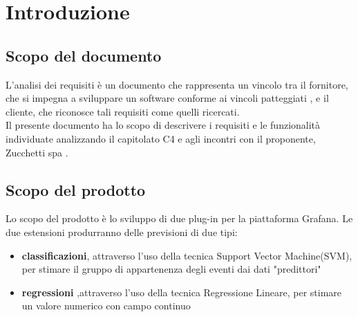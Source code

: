 \section{Introduzione}
	\subsection{Scopo del documento}
	L'analisi dei requisiti è un documento che rappresenta un vincolo tra il fornitore, che si impegna 		a sviluppare un software conforme ai vincoli patteggiati , e il cliente, che riconosce tali 			requisiti come quelli ricercati.
\\	Il presente documento ha lo scopo di descrivere i requisiti e le funzionalità individuate 			    analizzando il capitolato C4 e agli incontri con il proponente, Zucchetti spa .

	\subsection{Scopo del prodotto}
	Lo scopo del prodotto è lo sviluppo di due plug-in per la piattaforma Grafana. Le due estensioni     	produrranno delle previsioni di due tipi:
\\	
	\begin{itemize}
		\item \textbf {classificazioni}, attraverso l'uso della tecnica Support Vector Machine(SVM), per stimare il gruppo di appartenenza degli eventi dai dati "predittori"
		\item \textbf{regressioni} ,attraverso l'uso della tecnica Regressione Lineare, per stimare un valore numerico con campo continuo
	\end{itemize}